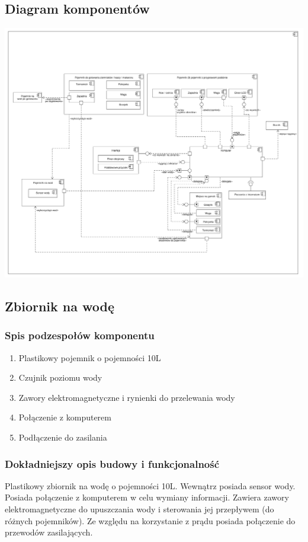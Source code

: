 \documentclass[12pt,a4paper,notitlepage]{report}
\begin{document}
\subsection{Diagram komponentów}
\includegraphics[scale=0.16,width=\textwidth,height=\textheight,keepaspectratio=true]{Diagram_komponentow.pdf}
\newpage

\subsection{Zbiornik na wodę}
\subsubsection{Spis podzespołów komponentu}
\begin{enumerate}
  \item Plastikowy pojemnik o pojemności 10L
  \item Czujnik poziomu wody
  \item Zawory elektromagnetyczne i rynienki do przelewania wody
  \item Połączenie z komputerem
  \item Podłączenie do zasilania
\end{enumerate}

\subsubsection{Dokładniejszy opis budowy i funkcjonalność}
Plastikowy zbiornik na wodę o pojemności 10L. Wewnątrz posiada sensor wody. Posiada połączenie z komputerem w celu wymiany informacji. Zawiera zawory elektromagnetyczne do upuszczania wody i sterowania jej przepływem (do różnych pojemników). Ze względu na korzystanie z prądu posiada połączenie do przewodów zasilających.
\end{document}
